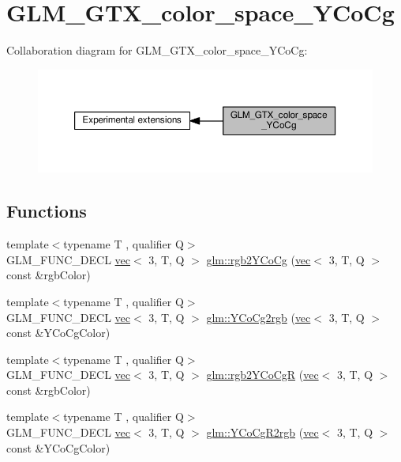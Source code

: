 \hypertarget{group__gtx__color__space__YCoCg}{}\section{G\+L\+M\+\_\+\+G\+T\+X\+\_\+color\+\_\+space\+\_\+\+Y\+Co\+Cg}
\label{group__gtx__color__space__YCoCg}
Collaboration diagram for G\+L\+M\+\_\+\+G\+T\+X\+\_\+color\+\_\+space\+\_\+\+Y\+Co\+Cg\+:
\nopagebreak
\begin{figure}[H]
\begin{center}
\leavevmode
\includegraphics[width=350pt]{d0/dc7/group__gtx__color__space__YCoCg}
\end{center}
\end{figure}
\subsection*{Functions}
\begin{DoxyCompactItemize}
\item 
{\footnotesize template$<$typename T , qualifier Q$>$ }\\G\+L\+M\+\_\+\+F\+U\+N\+C\+\_\+\+D\+E\+CL \hyperlink{structglm_1_1vec}{vec}$<$ 3, T, Q $>$ \hyperlink{group__gtx__color__space__YCoCg_ga0606353ec2a9b9eaa84f1b02ec391bc5}{glm\+::rgb2\+Y\+Co\+Cg} (\hyperlink{structglm_1_1vec}{vec}$<$ 3, T, Q $>$ const \&rgb\+Color)
\item 
{\footnotesize template$<$typename T , qualifier Q$>$ }\\G\+L\+M\+\_\+\+F\+U\+N\+C\+\_\+\+D\+E\+CL \hyperlink{structglm_1_1vec}{vec}$<$ 3, T, Q $>$ \hyperlink{group__gtx__color__space__YCoCg_ga163596b804c7241810b2534a99eb1343}{glm\+::\+Y\+Co\+Cg2rgb} (\hyperlink{structglm_1_1vec}{vec}$<$ 3, T, Q $>$ const \&Y\+Co\+Cg\+Color)
\item 
{\footnotesize template$<$typename T , qualifier Q$>$ }\\G\+L\+M\+\_\+\+F\+U\+N\+C\+\_\+\+D\+E\+CL \hyperlink{structglm_1_1vec}{vec}$<$ 3, T, Q $>$ \hyperlink{group__gtx__color__space__YCoCg_ga0389772e44ca0fd2ba4a79bdd8efe898}{glm\+::rgb2\+Y\+Co\+CgR} (\hyperlink{structglm_1_1vec}{vec}$<$ 3, T, Q $>$ const \&rgb\+Color)
\item 
{\footnotesize template$<$typename T , qualifier Q$>$ }\\G\+L\+M\+\_\+\+F\+U\+N\+C\+\_\+\+D\+E\+CL \hyperlink{structglm_1_1vec}{vec}$<$ 3, T, Q $>$ \hyperlink{group__gtx__color__space__YCoCg_gaf8d30574c8576838097d8e20c295384a}{glm\+::\+Y\+Co\+Cg\+R2rgb} (\hyperlink{structglm_1_1vec}{vec}$<$ 3, T, Q $>$ const \&Y\+Co\+Cg\+Color)
\end{DoxyCompactItemize}


